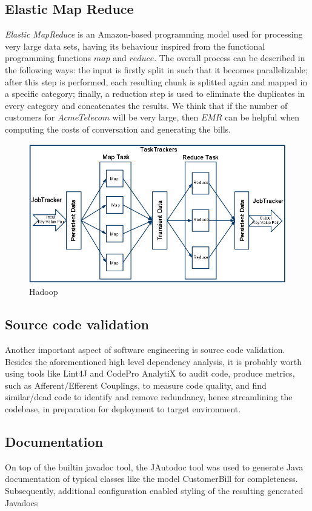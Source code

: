 \documentclass[11pt,twocolumn]{article} %
\begin{document}
\subsection{Elastic Map Reduce}
\emph{Elastic MapReduce} is an Amazon-based programming model used for processing very large data sets, having its behaviour inspired from the functional programming functions $map$ and $reduce$. The overall process can be described in the following ways: the input is firstly split in such that it becomes parallelizable; after this step is performed, each resulting chunk is splitted again and mapped in a specific category; finally, a reduction step is used to eliminate the duplicates in every category and concatenates the results. We think that if the number of customers for $AcmeTelecom$ will be very large, then $EMR$ can be helpful when computing the costs of conversation and generating the bills.
\begin{figure}[ht]
\includegraphics[scale=0.25]{hadoop.png}
\caption{Hadoop \cite{hadoop}}
\end{figure}

\subsection{Source code validation}
Another important aspect of software engineering is source code validation. Besides the
aforementioned high level dependency analysis, it is probably worth using tools like Lint4J
and CodePro AnalytiX to audit code, produce metrics, such as Afferent/Efferent Couplings, to measure code quality, and find similar/dead code to identify and remove redundancy, hence streamlining the codebase, in preparation for deployment to target environment.

\subsection{Documentation}
On top of the builtin javadoc tool, the JAutodoc tool was used to generate Java documentation of typical classes like the model CustomerBill for completeness.
Subsequently, additional configuration enabled styling of the resulting generated Javadocs
\end{document}

